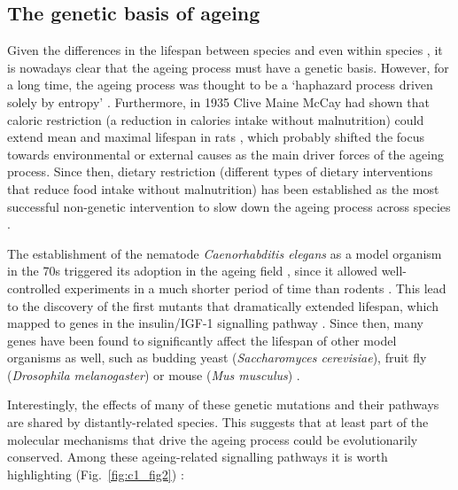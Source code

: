 \smallskip

\subsection{The genetic basis of ageing} \label{s:1.1.2}

\smallskip

Given the differences in the lifespan between species and even within species \cite{Jones2013, Gems2000}, it is nowadays clear that the ageing process must have a genetic basis. However, for a long time, the ageing process was thought to be a `haphazard process driven solely by entropy' \cite{Kenyon2005}. Furthermore, in 1935 Clive Maine McCay had shown that caloric restriction (a reduction in calories intake without malnutrition) could extend mean and maximal lifespan in rats \cite{McCay1935,McDonald2010}, which probably shifted the focus towards environmental or external causes as the main driver forces of the ageing process. Since then, dietary restriction (different types of dietary interventions that reduce food intake without malnutrition) has been established as the most successful non-genetic intervention to slow down the ageing process across species \cite{Fontana2015}.

\bigskip

The establishment of the nematode \textit{Caenorhabditis elegans} as a model organism in the 70s triggered its adoption in the ageing field \cite{KLASS1976}, since it allowed well-controlled experiments in a much shorter period of time than rodents \cite{Johnson2013}. This lead to the discovery of the first mutants that dramatically extended lifespan, which mapped to genes in the insulin/IGF-1 signalling pathway \cite{Kenyon1993,Morris1996}. Since then, many genes have been found to significantly affect the lifespan of other model organisms as well, such as budding yeast (\textit{Saccharomyces cerevisiae}), fruit fly (\textit{Drosophila melanogaster}) or mouse (\textit{Mus musculus}) \cite{Kenyon2005,Kenyon2010,Singh2019}. 

\bigskip

Interestingly, the effects of many of these genetic mutations and their pathways are shared by distantly-related species. This suggests that at least part of the molecular mechanisms that drive the ageing process could be evolutionarily conserved. Among these ageing-related signalling pathways it is worth highlighting (Fig.~\ref{fig:c1_fig2}) \cite{Kenyon2005,Kenyon2010,Singh2019,Greer2008}:

